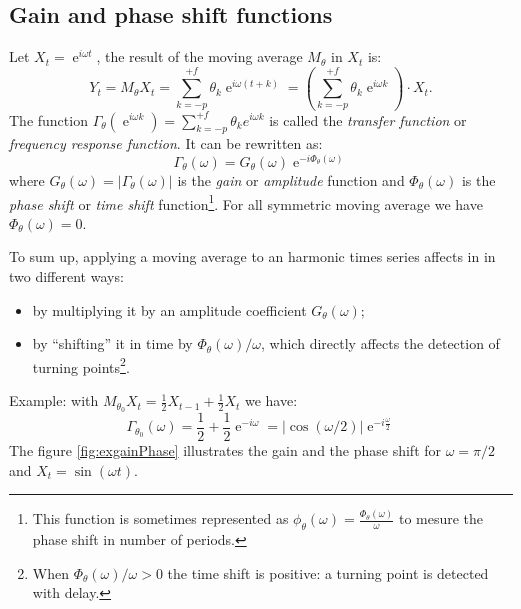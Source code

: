 \documentclass[
  12pt,
  ,
  a4paper]{article}
\DeclareMathOperator{\e}{e}
\newcommand\1{\mathds{1}}
\begin{document}
\hypertarget{gain-and-phase-shift-functions}{%
\subsection{Gain and phase shift functions}\label{gain-and-phase-shift-functions}}

Let \(X_t=\e^{i\omega t}\), the result of the moving average \(M_\theta\) in \(X_t\) is:
\[
Y_t = M_{\theta}X_t = \sum_{k=-p}^{+f} \theta_k \e^{i \omega (t+k)}
= \left(\sum_{k=-p}^{+f} \theta_k \e^{i \omega k}\right)\cdot X_t.
\]
The function \(\Gamma_\theta(\e^{i \omega k})=\sum_{k=-p}^{+f} \theta_k e^{i \omega k}\) is called the \emph{transfer function} or \emph{frequency response function}.
It can be rewritten as:
\[
\Gamma_\theta(\omega) = G_\theta(\omega)\e^{-i\Phi_\theta(\omega)}
\]
where \(G_\theta(\omega)=\lvert\Gamma_\theta(\omega)\rvert\) is the \emph{gain} or \emph{amplitude} function and \(\Phi_\theta(\omega)\) is the \emph{phase shift} or \emph{time shift} function\footnote{This function is sometimes represented as \(\phi_\theta(\omega)=\frac{\Phi_\theta(\omega)}{\omega}\) to mesure the phase shift in number of periods.}.
For all symmetric moving average we have \(\Phi_\theta(\omega)=0\).

To sum up, applying a moving average to an harmonic times series affects in in two different ways:

\begin{itemize}
\item
  by multiplying it by an amplitude coefficient \(G_{\theta}\left(\omega\right)\);
\item
  by ``shifting'' it in time by \(\Phi_\theta(\omega)/\omega\), which directly affects the detection of turning points\footnote{When \(\Phi_\theta(\omega)/\omega>0\) the time shift is positive: a turning point is detected with delay.}.
\end{itemize}

Example: with \(M_{\theta_0}X_t=\frac{1}{2}X_{t-1}+\frac{1}{2}X_{t}\) we have:
\[
\Gamma_{\theta_0}(\omega)=\frac{1}{2}+\frac{1}{2}\e^{-i\omega}
=\lvert\cos(\omega/2)\rvert\e^{-i\frac{\omega}{2}}
\]
The figure \ref{fig:exgainPhase} illustrates the gain and the phase shift for \(\omega=\pi/2\) and \(X_t=\sin(\omega t)\).
\end{document}
